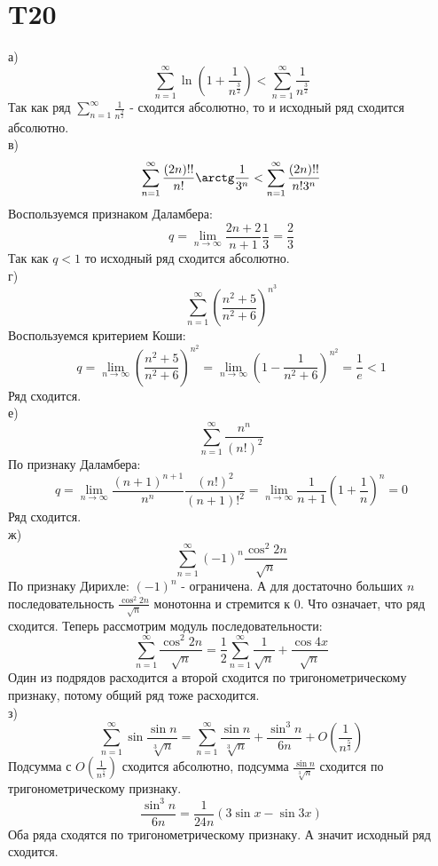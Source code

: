 \documentclass[12pt]{article}
\begin{document}
\section{T20}
а)
\[
    \sum_{n=1}^{\infty} \ln (1 + \frac{1}{n^{\frac{3}{2}}}) < \sum_{n=1}^{\infty} \frac{1}{n^{\frac{3}{2}}}
\]
Так как ряд $\sum_{n=1}^{\infty} \frac{1}{n^{\frac{3}{2}}}$ - сходится абсолютно, то и исходный ряд сходится абсолютно.\\
в)
\[
    \sum_{n=1}^{\infty} \frac{(2n)!!}{n!} \arctg \frac{1}{3^n} < \sum_{n=1}^{\infty} \frac{(2n)!!}{n! 3^n}
\]
Воспользуемся признаком Даламбера:
\[
    q = \lim_{n \to \infty} \frac{2n + 2}{n + 1} \frac{1}{3} = \frac{2}{3}
\]
Так как $q < 1$ то исходный ряд сходится абсолютно. \\
г) 
\[
    \sum_{n=1}^{\infty} \left( \frac{n^2 + 5}{n^2 + 6} \right)^{n^3}
\]
Воспользуемся критерием Коши:
\[
    q = \lim_{n \to \infty} \left( \frac{n^2 + 5}{n^2 + 6} \right)^{n^2} = \lim_{n \to \infty} \left( 1 - \frac{1}{n^2 + 6} \right)^{n^{2}} = \frac{1}{e} < 1
\]
Ряд сходится. \\
е)
\[
    \sum_{n=1}^{\infty} \frac{n^n}{(n!)^2}
\]
По признаку Даламбера: 
\[
    q = \lim_{n \to \infty} \frac{(n + 1)^{n+1}}{n^n} \frac{(n!)^2}{(n+1)!^2} = 
    \lim_{n \to \infty} \frac{1}{n+1} (1 + \frac{1}{n})^n = 0
\]
Ряд сходится.
\\
ж)
\[
    \sum_{n=1}^{\infty} (-1)^n \frac{\cos^2 2n}{\sqrt{n}}
\]
По признаку Дирихле: $(-1)^n $ - ограничена. А для достаточно больших $n$ последовательность 
$\frac{\cos ^2 2n}{\sqrt{n} }$ монотонна и стремится к 0. Что означает, что ряд сходится.  
Теперь рассмотрим модуль последовательности:
\[
    \sum_{n=1}^{\infty} \frac{\cos ^2 2n}{\sqrt{n} } = 
    \frac{1}{2}\sum_{n=1}^{\infty} \frac{1}{\sqrt{n}} + \frac{\cos 4x}{\sqrt{n} }
\]
Один из подрядов расходится а второй сходится по тригонометрическому признаку, потому общий ряд тоже расходится.
\\
з) 
\[
    \sum_{n=1}^{\infty} \sin \frac{\sin n}{\sqrt[3]{n}} = \sum_{n=1}^{\infty} \frac{\sin n}{\sqrt[3]{n}} + \frac{\sin^3 n}{6n} + O(\frac{1}{n^{\frac{5}{3}}})
\]
Подсумма с $O(\frac{1}{n^{\frac{5}{3}}})$ сходится абсолютно, подсумма $\frac{\sin n}{\sqrt[3]{n}}$ сходится по тригонометрическому признаку.
\[
    \frac{\sin^3 n}{6n} = \frac{1}{24n} \left( 3\sin x - \sin 3x \right) 
\]
Оба ряда сходятся по тригонометрическому признаку. А значит исходный ряд сходится.
\end{document}
